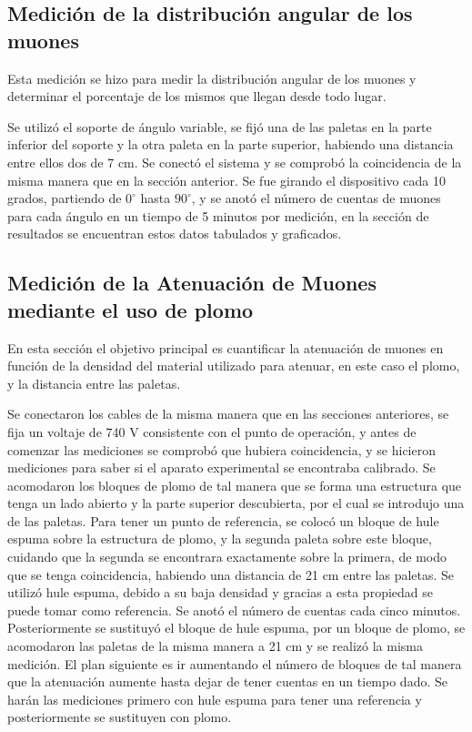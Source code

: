 \documentclass[a4paper,10pt]{article}
\numberwithin{equation}{section}
\begin{document}
\subsection{Medición de la distribución angular de los muones}
\label{ss:medicionangulos}

Esta medición se hizo para medir la distribución angular de los muones y determinar 
el porcentaje de los mismos que llegan desde todo lugar.

\vspace{.3cm}

Se utilizó el soporte de ángulo variable, se fijó una de las paletas en la parte 
inferior del soporte y la otra paleta en la parte superior, habiendo una distancia 
entre ellos dos de 7 cm. Se conectó el sistema y se comprobó la coincidencia
de la misma manera que en la sección anterior. Se fue girando el dispositivo cada 
10 grados, partiendo de $0^\circ$ hasta $90^\circ$, y se anotó el número de cuentas 
de muones para cada ángulo en un tiempo de 5 minutos por medición, en la sección
de resultados se encuentran estos datos tabulados y graficados.

\subsection{Medición de la Atenuación de Muones mediante el uso de plomo}
\label{ss:medicionplomo}

En esta sección el objetivo principal es cuantificar la atenuación de muones en 
función de la densidad del material utilizado para atenuar, en este caso el plomo, 
y la distancia entre las paletas. 

\vspace{.3cm}

Se conectaron los cables de la misma manera que en
las secciones anteriores, se fija un voltaje de 740 V consistente con el punto de 
operación, y antes de comenzar las 
mediciones se comprobó que hubiera coincidencia, y se hicieron mediciones para saber
si el aparato experimental se encontraba calibrado. Se acomodaron los bloques de plomo 
de tal manera que se forma una estructura que tenga un lado abierto y la parte 
superior descubierta, por el cual se introdujo una de las paletas. Para tener un 
punto de referencia, se colocó un bloque de hule espuma sobre la estructura de plomo,
y la segunda paleta sobre este bloque, cuidando que la segunda se encontrara 
exactamente sobre la primera, de modo que se tenga coincidencia, habiendo una 
distancia de 21 cm entre las paletas. Se utilizó hule espuma, debido a su baja 
densidad y gracias a esta propiedad se puede tomar como referencia. Se anotó el 
número de cuentas cada cinco minutos. Posteriormente se sustituyó el bloque de hule
espuma, por un bloque de plomo, se acomodaron las paletas de la misma manera a 21 cm
y se realizó la misma medición. El plan siguiente es ir aumentando el número de bloques de tal
manera que la atenuación aumente hasta dejar de tener cuentas en un tiempo dado. 
Se harán las mediciones primero con hule espuma para tener una referencia y
posteriormente se sustituyen con plomo.
\end{document}

